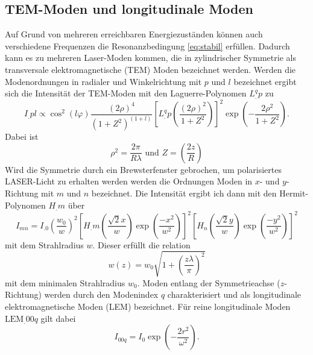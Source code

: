 \subsection{TEM-Moden und longitudinale Moden}
Auf Grund von mehreren erreichbaren Energiezuständen können auch verschiedene Frequenzen die Resonanzbedingung \eqref{eq:stabil} erfüllen. Dadurch kann es zu mehreren Laser-Moden kommen, die in zylindrischer Symmetrie als transversale elektromagnetische (TEM) Moden bezeichnet werden.
Werden die Modenordnungen in radialer und Winkelrichtung  mit $p$ und $l$ bezeichnet ergibt sich die Intensität der TEM-Moden mit den Laguerre-Polynomen $L^q_.p$ zu
\begin{equation}
I_.{pl} \propto \cos^2 (l \varphi) \frac{(2\rho)^4}{(1+Z^2)^{(1+l)}} \left[L^q_.{p}\left(\frac{(2 \rho)^2}{1+Z^2} \right)\right] ^2 \exp\left(-\frac{2\rho^2}{1+Z^2} \right)\text{.} \label{eq:intens}
\end{equation}
Dabei ist
\[
\rho^2 = \frac{2\pi}{R\lambda}\text{ und } Z = \left(\frac{2z}{R}\right)
\]
Wird die Symmetrie durch ein Brewsterfenster gebrochen, um polarisiertes LASER-Licht zu erhalten werden werden die Ordnungen Moden in $x$- und $y$- Richtung mit $m$ und $n$ bezeichnet.
Die Intensität ergibt ich dann mit den Hermit-Polynomen $H_.m$ über
\begin{equation}
I_{mn} = I_.0 \left(\frac{w_0}{w}\right)^2 \left[H_.m\left(\frac{\sqrt{2} x}{w}\right) \exp\left(\frac{-x^2}{w^2}\right) \right]^2 \left[H_n\left(\frac{\sqrt{2} y}{w}\right) \exp\left(\frac{-y^2}{w^2}\right) \right]^2
\label{eq:intens2}
\end{equation}
mit dem Strahlradius $w$.
Dieser erfüllt die relation
\[
w (z) = w_0\sqrt{1+\left(\frac{z\lambda}{\pi}\right)^2}
\]
mit dem minimalen Strahlradius $w_0$.
Moden entlang der Symmetrieachse ($z$-Richtung) werden durch den Modenindex $q$ charakterisiert und als longitudinale elektromagnetische Moden (LEM) bezeichnet. Für reine longitudinale Moden $\text{LEM}_.{00q}$ gilt dabei
\begin{equation}
I_{00q} = I_0 \exp\left(-\frac{2 r^2}{\omega ^2}\right)\text{.} \label{eq:gaus}
\end{equation}


